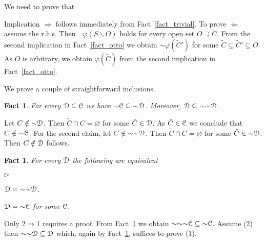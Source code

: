 \documentclass{amsproc}
\makeatletter
\newcommand{\mylabel}[1]{{#1}\hfill}
\renewenvironment{itemize}
  {\begin{list}{$\triangleright$}{%
  \setlength{\parskip}{0mm}
  \setlength{\topsep}{.1\baselineskip}
  \setlength{\rightmargin}{0mm}
  \setlength{\listparindent}{0mm}
  \setlength{\itemindent}{0mm}
  \setlength{\labelwidth}{3ex}
  \setlength{\itemsep}{.1\baselineskip}
  \setlength{\parsep}{.1\baselineskip}
  \setlength{\partopsep}{0mm}
  \setlength{\labelsep}{1ex}
  \setlength{\leftmargin}{\labelwidth+\labelsep}
  \let\makelabel\mylabel}}{%
\end{list}}
\newcounter{thm}
\theoremstyle{mio}
\newtheorem{fact}[thm]{Fact}\tcolorboxenvironment{fact}{mythm}
\providecommand{\proofNameStyle}{\bfseries}
\renewenvironment{proof}[1][\proofname]{\par
  \pushQED{\qed}%
  \normalfont%
  \trivlist
  \item[\hskip\labelsep
        \proofNameStyle
    #1\@addpunct{.}]\ignorespaces
}{%
  \popQED\endtrivlist\@endpefalse
}
\makeatother
\begin{document}
\begin{proof}
  We need to prove that 


  Implication $\Rightarrow$ follows immediately from Fact~\ref{fact_trivial}.
  To prove  $\Leftarrow$ assume the r.h.s.
  Then $\neg\varphi(S\smallsetminus O)$ holds for every open set  $O\supseteq\tilde C$.
  From the second implication in Fact~\ref{fact_otto} we obtain ${\sim}\varphi(\tilde C')$ for some $\tilde C\subseteq\tilde C'\subseteq O$.
  As $O$ is arbitrary, we obtain $\varphi(\tilde C)$ from the second implication in  Fact~\ref{fact_otto}.
\end{proof}

We prove a couple of straightforward inclusions.

\begin{fact}\label{fact_~inclusione}
  For every ${\EuScript D}\subseteq{\EuScript C}$ we have ${\sim}{\EuScript C}\subseteq{\sim}{\EuScript D}$.  
  Moreover, ${\EuScript D}\subseteq{\sim}{\sim}{\EuScript D}$.
\end{fact}

\begin{proof}
  Let $C\notin{\sim}{\EuScript D}$.
  Then $\tilde C\cap C=\varnothing$ for some $\tilde C\in{\EuScript D}$.
  As  $\tilde C\in{\EuScript C}$ we conclude that  $C\notin{\sim}{\EuScript C}$.
  For the second claim, let $C\notin{\sim}{\sim}{\EuScript D}$.
  Then $\tilde C\cap C=\varnothing$ for some $\tilde C\in{\sim}{\EuScript D}$.
  Then $C\notin{\EuScript D}$ follows.
\end{proof}

\begin{fact}
  For every ${\EuScript D}$ the following are equivalent
  \begin{itemize}
    \item [1.] ${\EuScript D}={\sim}{\sim}{\EuScript D}$.
    \item [2.] ${\EuScript D}={\sim}{\EuScript C}$ for some ${\EuScript C}$.
  \end{itemize}
\end{fact}
  
\begin{proof}
  Only 2$\Rightarrow$1 requires a proof.
  From Fact~\ref{fact_~inclusione} we obtain ${\sim}{\sim}{\sim}{\EuScript C}\subseteq{\sim}{\EuScript C}$.
  Assume (2) then ${\sim}{\sim}{\EuScript D}\subseteq{\EuScript D}$ which, again by Fact~\ref{fact_~inclusione}, suffices to prove (1).
\end{proof}
\end{document}
